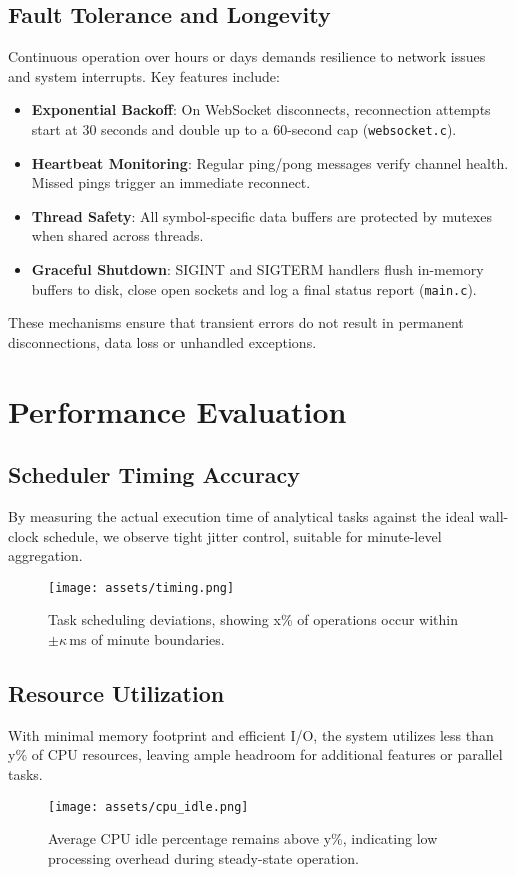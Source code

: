 \documentclass{article}
\begin{document}
\subsection{Fault Tolerance and Longevity}
Continuous operation over hours or days demands resilience to network issues and system interrupts. Key features include:
\begin{itemize}
  \item \textbf{Exponential Backoff}: On WebSocket disconnects, reconnection attempts start at 30 seconds and double up to a 60-second cap (\texttt{websocket.c}).
  \item \textbf{Heartbeat Monitoring}: Regular ping/pong messages verify channel health. Missed pings trigger an immediate reconnect.
  \item \textbf{Thread Safety}: All symbol-specific data buffers are protected by mutexes when shared across threads.
  \item \textbf{Graceful Shutdown}: SIGINT and SIGTERM handlers flush in-memory buffers to disk, close open sockets and log a final status report (\texttt{main.c}).
\end{itemize}
These mechanisms ensure that transient errors do not result in permanent disconnections, data loss or unhandled exceptions. \newpage

\section{Performance Evaluation}

\subsection{Scheduler Timing Accuracy}
By measuring the actual execution time of analytical tasks against the ideal wall-clock schedule, we observe tight jitter control, suitable for minute-level aggregation.
\begin{figure}[h]
  \centering
  \texttt{[image: assets/timing.png]}
  \caption{Task scheduling deviations, showing x\% of operations occur within $\pm\kappa$\,ms of minute boundaries.}
\end{figure}

\subsection{Resource Utilization}
With minimal memory footprint and efficient I/O, the system utilizes less than y\% of CPU resources, leaving ample headroom for additional features or parallel tasks.
\begin{figure}[h]
  \centering
  \texttt{[image: assets/cpu\_idle.png]}
  \caption{Average CPU idle percentage remains above y\%, indicating low processing overhead during steady-state operation.}
\end{figure}
\end{document}
